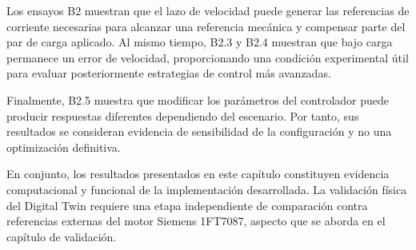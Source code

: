 Los ensayos B2 muestran que el lazo de velocidad puede generar las referencias de corriente necesarias para alcanzar una referencia mecánica y compensar parte del par de carga aplicado. Al mismo tiempo, B2.3 y B2.4 muestran que bajo carga permanece un error de velocidad, proporcionando una condición experimental útil para evaluar posteriormente estrategias de control más avanzadas.

Finalmente, B2.5 muestra que modificar los parámetros del controlador puede producir respuestas diferentes dependiendo del escenario. Por tanto, sus resultados se consideran evidencia de sensibilidad de la configuración y no una optimización definitiva.

En conjunto, los resultados presentados en este capítulo constituyen evidencia computacional y funcional de la implementación desarrollada. La validación física del Digital Twin requiere una etapa independiente de comparación contra referencias externas del motor Siemens 1FT7087, aspecto que se aborda en el capítulo de validación.

